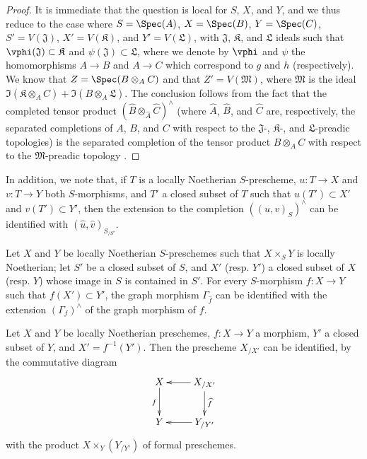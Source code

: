 \begin{proof}
It is immediate that the question is local for $S$, $X$, and $Y$, and we thus reduce to the case where $S=\Spec(A)$, $X=\Spec(B)$, $Y=\Spec(C)$, $S'=V(\mathfrak{J})$, $X'=V(\mathfrak{K})$, and $Y'=V(\mathfrak{L})$, with $\mathfrak{J}$, $\mathfrak{K}$, and $\mathfrak{L}$ ideals such that $\vphi(\mathfrak{J})\subset\mathfrak{K}$ and $\psi(\mathfrak{J})\subset\mathfrak{L}$, where we denote by $\vphi$ and $\psi$ the homomorphisms $A\to B$ and $A\to C$ which correspond to $g$ and $h$ (respectively).
We know that $Z=\Spec(B\otimes_A C)$ and that $Z'=V(\mathfrak{M})$, where $\mathfrak{M}$ is the ideal $\Im(\mathfrak{K}\otimes_A C)+\Im(B\otimes_A\mathfrak{L})$.
The conclusion follows  from the fact that the completed tensor product $(\widehat{B}\otimes_{\widehat{A}}\widehat{C})^\wedge$ (where $\widehat{A}$, $\widehat{B}$, and $\widehat{C}$ are, respectively, the separated completions of $A$, $B$, and $C$ with respect to the $\mathfrak{J}$-, $\mathfrak{K}$-, and $\mathfrak{L}$-preadic topologies) is the separated completion of the tensor product $B\otimes_A C$ with respect to the $\mathfrak{M}$-preadic topology .
\end{proof}

In addition, we note that, if $T$ is a locally Noetherian $S$-prescheme, $u:T\to X$ and $v:T\to Y$ both $S$-morphisms, and $T'$ a closed subset of $T$ such that $u(T')\subset X'$ and $v(T')\subset Y'$, then the extension to the completion $((u,v)_S)^\wedge$ can be identified with $(\widehat{u},\widehat{v})_{S_{/S'}}$.

\begin{corollary}[10.9.8]
\label{I.10.9.8}
Let $X$ and $Y$ be locally Noetherian $S$-preschemes such that $X\times_S Y$ is locally Noetherian; let $S'$ be a closed subset of $S$, and $X'$ (resp. $Y'$) a closed subset of $X$ (resp. $Y$) whose image in $S$ is contained in $S'$.
For every $S$-morphism $f:X\to Y$ such that $f(X')\subset Y'$, the graph morphism $\Gamma_{\widehat{f}}$ can be identified with the extension $(\Gamma_f)^\wedge$ of the graph morphism of $f$.
\end{corollary}

\begin{corollary}[10.9.9]
\label{I.10.9.9}
Let $X$ and $Y$ be locally Noetherian preschemes, $f:X\to Y$ a morphism, $Y'$ a closed subset of $Y$, and $X'=f^{-1}(Y')$.
Then the prescheme $X_{/X'}$ can be identified, by the commutative diagram
\[
  \xymatrix{
    X\ar[d]_f &
    X_{/X'}\ar[l]\ar[d]^{\widehat{f}}\\
    Y &
    Y_{/Y'}\ar[l]
  }
\]
with the product $X\times_Y(Y_{/Y'})$ of formal preschemes.
\end{corollary}

